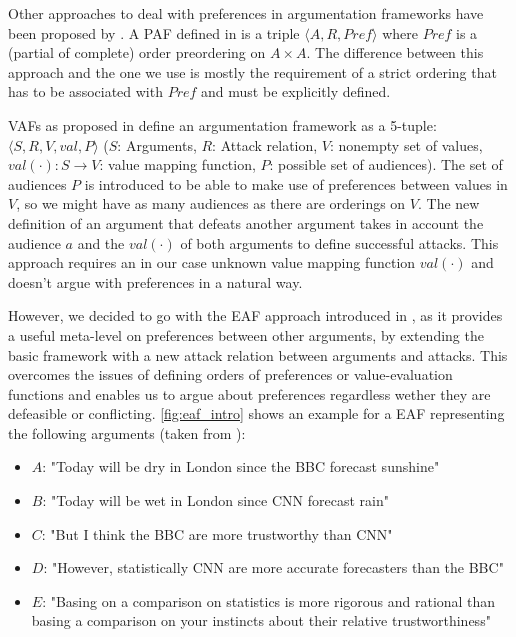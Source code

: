 Other approaches to deal with preferences in argumentation frameworks have been proposed by \cite{amgoud,amgoud1998,Bench2003}. A \gls{PAF} defined in \cite{amgoud1998} is  a triple $\langle A, R, Pref \rangle$ where $Pref$ is a (partial of complete) order preordering on $A \times A$. The difference between this approach and the one we use is mostly the requirement of a strict ordering that has to be associated with $Pref$ and must be explicitly defined.

\glspl{VAF} as proposed in \cite{Bench2003} define an argumentation framework as a 5-tuple: $\langle S, R, V, val, P \rangle$ ($S$: Arguments, $R$: Attack relation, $V$: nonempty set of values, $val(\cdot): S \rightarrow V$: value mapping function, $P$: possible set of audiences). The set of audiences $P$ is introduced to be able to make use of preferences between values in $V$, so we might have as many audiences as there are orderings on $V$. The new definition of an argument that defeats another argument takes in account the audience $a$ and the $val(\cdot)$ of both arguments to define successful attacks. This approach requires an in our case unknown value mapping function $val(\cdot)$ and doesn't argue with preferences in a natural way.

However, we decided to go with the \gls{EAF} approach introduced in \cite{Modgil2009}, as it provides a useful meta-level on preferences between other arguments, by extending the basic framework with a new attack relation between arguments and attacks. This overcomes the issues of defining orders of preferences or value-evaluation functions and enables us to argue about preferences regardless wether they are defeasible or conflicting. \autoref{fig:eaf_intro} shows an example for a \gls{EAF} representing the following arguments (taken from \cite{Modgil2009}):
\begin{itemize}
	\item $A$: "Today will be dry in London since the BBC forecast sunshine"
	\item $B$: "Today will be wet in London since CNN forecast rain"
	\item $C$: "But I think the BBC are more trustworthy than CNN"
	\item $D$: "However, statistically CNN are more accurate forecasters than the BBC"
	\item $E$: "Basing on a comparison on statistics is more rigorous and rational than basing a comparison on your instincts about their relative trustworthiness"
\end{itemize}

